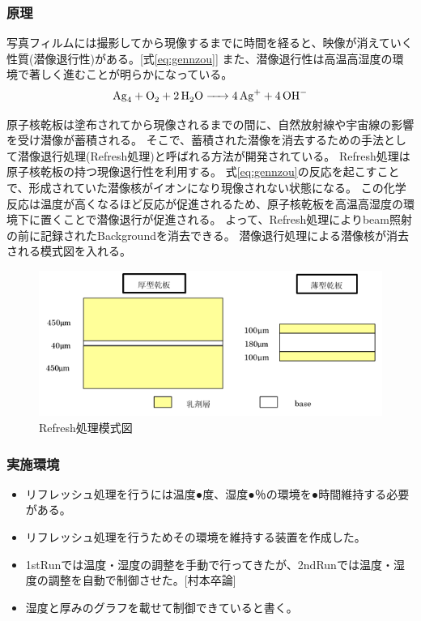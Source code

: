 \documentclass[12pt,a4paper]{jarticle}
\begin{document}
\subsubsection{原理}
写真フィルムには撮影してから現像するまでに時間を経ると、映像が消えていく性質(潜像退行性)がある。[式\ref{eq:gennzou}]
また、潜像退行性は高温高湿度の環境で著しく進むことが明らかになっている。
\begin{equation}
    \ce{Ag4 + O2 + 2H2O -> 4Ag+ + 4OH-}
\label{eq:gennzou}
\end{equation}
\par
原子核乾板は塗布されてから現像されるまでの間に、自然放射線や宇宙線の影響を受け潜像が蓄積される。
そこで、蓄積された潜像を消去するための手法として潜像退行処理(Refresh処理)と呼ばれる方法が開発されている。
\cite{takusann}
Refresh処理は原子核乾板の持つ現像退行性を利用する。
式\ref{eq:gennzou}の反応を起こすことで、形成されていた潜像核がイオンになり現像されない状態になる。
この化学反応は温度が高くなるほど反応が促進されるため、原子核乾板を高温高湿度の環境下に置くことで潜像退行が促進される。
よって、Refresh処理によりbeam照射の前に記録されたBackgroundを消去できる。
潜像退行処理による潜像核が消去される模式図を入れる。
\begin{figure}[htbp]
    \begin{center}
     \includegraphics[width=140mm]{emulsionorder.png}
    \end{center}
    \caption{Refresh処理模式図\label{fig:intr_refresh}}
\end{figure}
\subsubsection{実施環境}
\begin{itemize}
 \item リフレッシュ処理を行うには温度●度、湿度●％の環境を●時間維持する必要がある。
 \item リフレッシュ処理を行うためその環境を維持する装置を作成した。
 \item 1stRunでは温度・湿度の調整を手動で行ってきたが、2ndRunでは温度・湿度の調整を自動で制御させた。[村本卒論]
 \item 湿度と厚みのグラフを載せて制御できていると書く。
\end{itemize}
\end{document}
